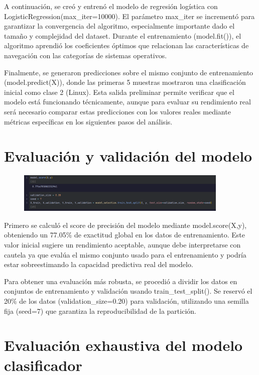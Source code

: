 \documentclass{article}
\begin{document}
A continuación, se creó y entrenó el modelo de regresión logística con LogisticRegression(max\_iter=10000). El parámetro max\_iter se incrementó para garantizar la convergencia del algoritmo, especialmente importante dado el tamaño y complejidad del dataset. Durante el entrenamiento (model.fit()), el algoritmo aprendió los coeficientes óptimos que relacionan las características de navegación con las categorías de sistemas operativos.

Finalmente, se generaron predicciones sobre el mismo conjunto de entrenamiento (model.predict(X)), donde las primeras 5 muestras mostraron una clasificación inicial como clase 2 (Linux). Esta salida preliminar permite verificar que el modelo está funcionando técnicamente, aunque para evaluar su rendimiento real será necesario comparar estas predicciones con los valores reales mediante métricas específicas en los siguientes pasos del análisis.

\section*{Evaluación y validación del modelo}

\begin{figure}[H]
\centering
\includegraphics[width=0.9\textwidth]{Actividad-11/Imagen8.png}
\end{figure}

Primero se calculó el score de precisión del modelo mediante model.score(X,y), obteniendo un 77.05\% de exactitud global en los datos de entrenamiento. Este valor inicial sugiere un rendimiento aceptable, aunque debe interpretarse con cautela ya que evalúa el mismo conjunto usado para el entrenamiento y podría estar sobreestimando la capacidad predictiva real del modelo.

Para obtener una evaluación más robusta, se procedió a dividir los datos en conjuntos de entrenamiento y validación usando train\_test\_split(). Se reservó el 20\% de los datos (validation\_size=0.20) para validación, utilizando una semilla fija (seed=7) que garantiza la reproducibilidad de la partición.

\section*{Evaluación exhaustiva del modelo clasificador}
\end{document}
